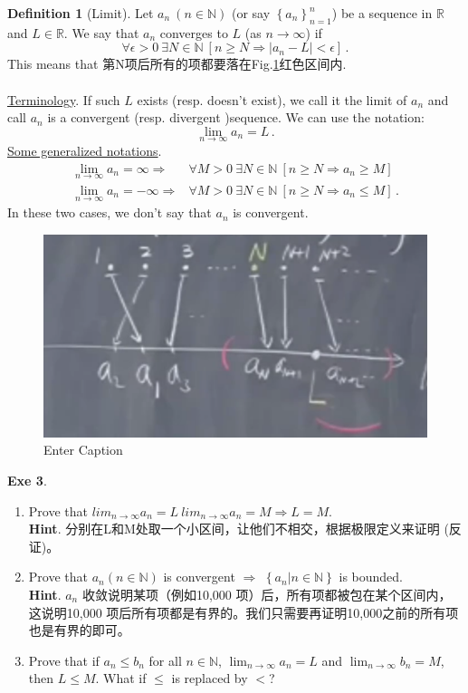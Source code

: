 \documentclass{book}
\theoremstyle{definition}
\newtheorem{definition}{Definition}[section]
\begin{document}
\begin{definition}[Limit]
\label{def:limit}
Let $a_n~(n\in\mathbb{N})$ (or say $\left\{ a_n \right\}_{n=1}^{n}$) be a sequence in $\mathbb{R}$ and $L\in\mathbb{R}$. We say that $a_n$ converges to $L$ (as $n\rightarrow\infty$) if
\begin{equation}
    \forall \epsilon>0~ \exists N\in \mathbb{N} ~[n\ge N \mathbb \Rightarrow |a_n-L|<\epsilon] \,.
\end{equation}
This means that 第N项后所有的项都要落在Fig.\ref{fig:limit}红色区间内.\\
~\\
\uline{Terminology}. If such $L$ exists (resp. doesn't exist), we call it the limit of $a_n$ and call $a_n$ is a convergent (resp. divergent )sequence. We can use the notation:
\begin{equation}
    \lim_{n\rightarrow \infty} a_n = L \,.
\end{equation}
\uline{Some generalized notations}. 
\begin{equation}
\begin{aligned}
\lim_{n\to \infty} a_n = \infty \Rightarrow & \forall M>0~ \exists N\in \mathbb{N} ~[n\ge N \mathbb \Rightarrow a_n\ge M]\\
\lim_{n\to \infty} a_n = -\infty \Rightarrow & \forall M>0~ \exists N\in \mathbb{N} ~[n\ge N \mathbb \Rightarrow a_n\le M] \,.
\end{aligned}
\end{equation}
In these two cases, we don't say that $a_n$ is convergent.
\end{definition}

\begin{figure}
    \centering
    \includegraphics[width=0.5\linewidth]{image.png}
    \caption{Enter Caption}
    \label{fig:limit}
\end{figure}

\noindent \textbf{Exe 3}. 
\begin{enumerate}
    \item Prove that $lim_{n\to\infty} a_n = L ~ lim_{n\to\infty} a_n = M \Rightarrow L=M$.\\
    \textbf{Hint}. 分别在L和M处取一个小区间，让他们不相交，根据极限定义来证明 (反证)。
    \item Prove that $a_n (n\in\mathbb{N})$ is convergent $\Rightarrow$ $\left\{ a_n | n\in \mathbb{N} \right\}$ is bounded.\\
    \textbf{Hint}. $a_n$ 收敛说明某项（例如10,000 项）后，所有项都被包在某个区间内，这说明10,000 项后所有项都是有界的。我们只需要再证明10,000之前的所有项也是有界的即可。\\
    \item Prove that if $a_n\le b_n$ for all $n\in\mathbb{N}$, $\lim_{n\to \infty} a_n=L$ and  $\lim_{n\to \infty} b_n=M$, then $L\le M$. What if $\leq$ is replaced by $<$?
\end{enumerate}
\end{document}

